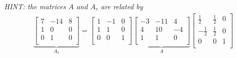 \begin{enumerate}
{\em HINT: the matrices $A$ and $A_r$ are related by
\begin{align*}
\underbrace{\begin{bmatrix}
 7 & -14 & 8 \\
 1 & 0 & 0 \\
 0 & 1 & 0\\
\end{bmatrix} }_{A_r}
= \begin{bmatrix}
1 & -1 & 0\\
1 &  1 & 0\\
0 &  0 & 1\\
\end{bmatrix}
\underbrace{
\begin{bmatrix}
 -3 & -11 & 4 \\
 4 & 10 & -4 \\
 1 & 1 & 0\\
\end{bmatrix}
}_{A}
\begin{bmatrix}
\frac{1}{2} & \frac{1}{2} & 0\\
-\frac{1}{2} &  \frac{1}{2} & 0\\
0 &  0 & 1\\
\end{bmatrix}
\end{align*}
}



\end{enumerate}
